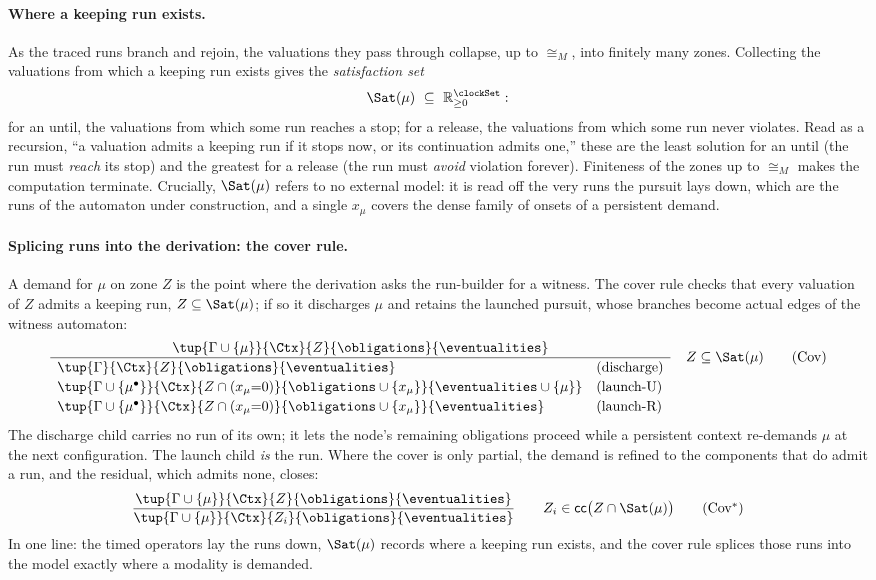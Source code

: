 \paragraph{Where a keeping run exists.}
As the traced runs branch and rejoin, the valuations they pass through collapse, up to $\cong_M$, into
finitely many zones. Collecting the valuations from which a keeping run exists gives the \emph{satisfaction
set}
\[
\Sat(\mu)\ \subseteq\ \mathbb{R}_{\ge0}^{\clockSet}:
\]
for an until, the valuations from which some run reaches a stop; for a release, the valuations from which
some run never violates. Read as a recursion, ``a valuation admits a keeping run if it stops now, or its
continuation admits one,'' these are the least solution for an until (the run must \emph{reach} its stop)
and the greatest for a release (the run must \emph{avoid} violation forever). Finiteness of the zones up to
$\cong_M$ makes the computation terminate. Crucially, $\Sat(\mu)$ refers to no external model: it is read
off the very runs the pursuit lays down, which are the runs of the automaton under construction, and a
single $x_\mu$ covers the dense family of onsets of a persistent demand.

\paragraph{Splicing runs into the derivation: the cover rule.}
A demand for $\mu$ on zone $Z$ is the point where the derivation asks the run-builder for a witness. The
cover rule checks that every valuation of $Z$ admits a keeping run, $Z\subseteq\Sat(\mu)$; if so it
discharges $\mu$ and retains the launched pursuit, whose branches become actual edges of the witness
automaton:
\[
\frac{\tup{\Gamma\cup\{\mu\}}{\Ctx}{Z}{\obligations}{\eventualities}}
{\begin{array}{ll}
\tup{\Gamma}{\Ctx}{Z}{\obligations}{\eventualities} & (\text{discharge})\\[2pt]
\tup{\Gamma\cup\{\mu^\bullet\}}{\Ctx}{Z\cap(x_\mu{=}0)}{\obligations\cup\{x_\mu\}}{\eventualities\cup\{\mu\}} & (\text{launch-U})\\[2pt]
\tup{\Gamma\cup\{\mu^\bullet\}}{\Ctx}{Z\cap(x_\mu{=}0)}{\obligations\cup\{x_\mu\}}{\eventualities} & (\text{launch-R})
\end{array}}
\quad Z\subseteq\Sat(\mu)
\tag{\textrm{Cov}}\label{tag:chk}
\]
The discharge child carries no run of its own; it lets the node's remaining obligations proceed while a
persistent context re-demands $\mu$ at the next configuration. The launch child \emph{is} the run. Where
the cover is only partial, the demand is refined to the components that do admit a run, and the residual,
which admits none, closes:
\[
\frac{\tup{\Gamma\cup\{\mu\}}{\Ctx}{Z}{\obligations}{\eventualities}}
{\tup{\Gamma\cup\{\mu\}}{\Ctx}{Z_i}{\obligations}{\eventualities}}
\qquad Z_i\in\mathsf{cc}\big(Z\cap\Sat(\mu)\big)
\tag{\textrm{Cov}$^{*}$}\label{tag:chkstar}
\]
In one line: the timed operators lay the runs down, $\Sat(\mu)$ records where a keeping run exists, and the
cover rule splices those runs into the model exactly where a modality is demanded.

